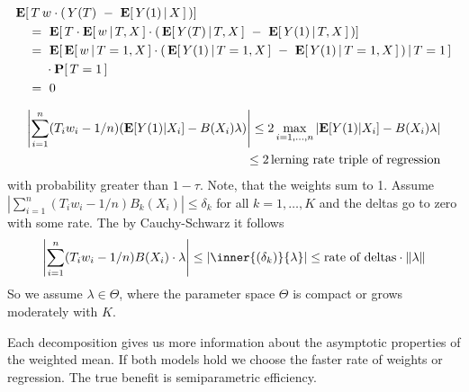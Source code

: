 \begin{align*}
  &\E[
  \,
    T\, w
    \cdot
    (
    \,
      Y(T)\  -\  \E[\,Y(1)\,|\,X\,]
      \,
    )
  ]
  \\
  &
  \quad 
  =
  \ 
  \E
  [
  \,
    T
    \cdot
    \E[
    \,
    w
    \,
    |
    \,
    T,X
    \,
    ]
    \cdot
    (
    \,
      \E[\,Y(T)\,|\,T,X\,]
      \ 
      -
      \ 
      \E[\,Y(1)\,|\,T,X\,]
      \,
    )
  ]
  \\
  &
  \quad 
  =
  \ 
  \E
  [
  \,
    \E[
    \,
    w
    \,
    |
    \,
    T=1,X
    \,
    ]
    \cdot
    (
    \,
      \E[\,Y(1)\,|\,T=1,X\,]
      \ 
      -
      \ 
      \E[\,Y(1)\,|\,T=1,X\,]
      \,
    )
    \,
    |\,T=1
    \,
  ]
  \\
  &\qquad
  \ 
  \cdot
  \P[\,T=1\,]
  \\
  &\quad
  =\ 0
\end{align*}

\begin{align}
  \left| 
  \sum_{i=1}^{n} 
  (T_i w_i-1/n)
  (
  \mathbf{E}[Y(1)|X_i]
  -
  B(X_i)\lambda
  )
  \right|
  \le
  2
  \max_{i=1,\ldots,n}
  \left| 
  \mathbf{E}[Y(1)|X_i]
  -
  B(X_i)\lambda
  \right|
  \\
  \le
  2
  \,
  \text{lerning rate triple of regression}
\end{align}
with probability greater than $1-\tau$.
Note, that 
the weights sum to 1.
Assume 
$
  \left| 
  \sum_{i=1}^{n} 
  (T_i w_i-1/n)
  B_k(X_i)
  \right|
  \le \delta_k
$
for all $k=1,\ldots,K$ and the deltas go to zero with some rate.
The by Cauchy-Schwarz it follows
\begin{gather}
  \left| 
  \sum_{i=1}^{n} 
  (T_i w_i-1/n)
  B(X_i)\cdot \lambda
  \right|
  \le \left| 
  \inner{(\delta_k)}{\lambda}
  \right|
  \le
  \text{rate of deltas}
  \cdot
  \norm{\lambda}
\end{gather}
So we assume $\lambda\in \Theta$, where the parameter space $\Theta$ is compact or grows moderately with $K$.



\begin{takeaways}
  Each decomposition gives us more information about the asymptotic properties of the weighted mean. If both models hold we choose the faster rate of weights or regression. The true benefit is semiparametric efficiency.
\end{takeaways}

